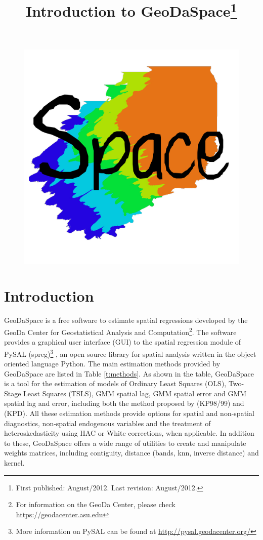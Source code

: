 \documentclass{article}
\title{Introduction to GeoDaSpace\footnote{First published: August/2012. Last revision: August/2012.}}
\author{}
\date{}
\begin{document}
\maketitle

\begin{figure}[htb]
\begin{center}
\includegraphics[width=0.5\linewidth]{geodaspace.png}\\
\end{center}
\end{figure}

\setcounter{secnumdepth}{3} 
\setcounter{tocdepth}{2}   
\tableofcontents
\newpage

\section{Introduction}
\label{s:intro}

GeoDaSpace is a free software to estimate spatial regressions developed by the GeoDa Center for Geostatistical Analysis and Computation\footnote{For information on the GeoDa Center, please check \url{https://geodacenter.asu.edu}}. The software provides a graphical user interface (GUI) to the spatial regression module of PySAL (spreg)\footnote{More information on PySAL can be found at \url{http://pysal.geodacenter.org/}} \citep{Rey07}, an open source library for spatial analysis written in the object oriented language Python. The main estimation methods provided by GeoDaSpace are listed in Table \ref{t:methods}. As shown in the table, GeoDaSpace is a tool for the estimation of models of Ordinary Least Squares (OLS), Two-Stage Least Squares (TSLS), GMM spatial lag, GMM spatial error and GMM spatial lag and error, including both the method proposed by \citet{Kelejian98,Kelejian99} (KP98/99) and \citet{Drukker10} (KPD). All these estimation methods provide options for spatial and non-spatial diagnostics, non-spatial endogenous variables and the treatment of heteroskedasticity using HAC or White corrections, when applicable. In addition to these, GeoDaSpace offers a wide range of utilities to create and manipulate weights matrices, including contiguity, distance (bands, knn, inverse distance) and kernel.
\end{document}
